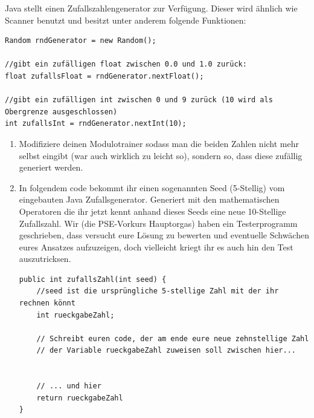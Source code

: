 \documentclass{../../sheet}
\begin{document}
\newpage
{}
Java stellt einen Zufallszahlengenerator zur Verfügung. Dieser wird ähnlich wie Scanner benutzt und besitzt unter anderem folgende Funktionen:

\begin{verbatim}
Random rndGenerator = new Random();

//gibt ein zufälligen float zwischen 0.0 und 1.0 zurück:
float zufallsFloat = rndGenerator.nextFloat();

//gibt ein zufälligen int zwischen 0 und 9 zurück (10 wird als Obergrenze ausgeschlossen)
int zufallsInt = rndGenerator.nextInt(10);
\end{verbatim}

\begin{enumerate}
    \item Modifiziere deinen Modulotrainer sodass man die beiden Zahlen nicht mehr selbst eingibt (war auch wirklich zu leicht so), sondern so, dass diese zufällig generiert werden. 
    \item In folgendem code bekommt ihr einen sogenannten Seed (5-Stellig) vom eingebauten Java Zufallsgenerator. Generiert mit den mathematischen Operatoren die ihr jetzt kennt anhand dieses Seeds eine neue 10-Stellige Zufallszahl. Wir (die PSE-Vorkurs Hauptorgas) haben ein Testerprogramm geschrieben, dass versucht eure Lösung zu bewerten und eventuelle Schwächen eures Ansatzes aufzuzeigen, doch vielleicht kriegt ihr es auch hin den Test auszutricksen.
    
    \begin{verbatim}
public int zufallsZahl(int seed) {
    //seed ist die ursprüngliche 5-stellige Zahl mit der ihr rechnen könnt
    int rueckgabeZahl;

    // Schreibt euren code, der am ende eure neue zehnstellige Zahl
    // der Variable rueckgabeZahl zuweisen soll zwischen hier...


    // ... und hier
    return rueckgabeZahl
}
    \end{verbatim}
\end{enumerate}
\end{document}
